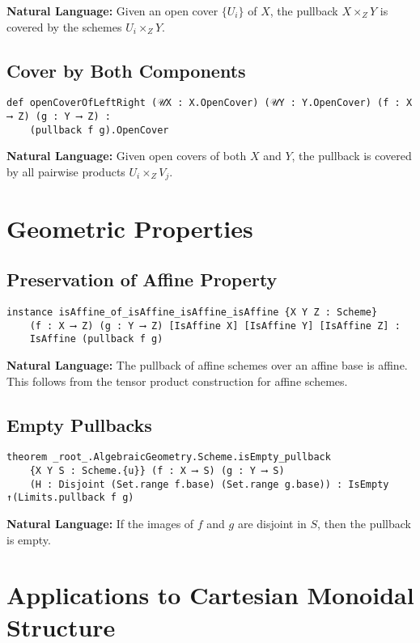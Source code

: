 \documentclass{article}
\theoremstyle{definition}
\begin{document}
\textbf{Natural Language:} Given an open cover $\{U_i\}$ of $X$, the pullback $X \times_Z Y$ is covered by the schemes $U_i \times_Z Y$.

\subsection{Cover by Both Components}

\begin{lstlisting}
def openCoverOfLeftRight (𝒰X : X.OpenCover) (𝒰Y : Y.OpenCover) (f : X ⟶ Z) (g : Y ⟶ Z) :
    (pullback f g).OpenCover
\end{lstlisting}

\textbf{Natural Language:} Given open covers of both $X$ and $Y$, the pullback is covered by all pairwise products $U_i \times_Z V_j$.

\section{Geometric Properties}

\subsection{Preservation of Affine Property}

\begin{lstlisting}
instance isAffine_of_isAffine_isAffine_isAffine {X Y Z : Scheme}
    (f : X ⟶ Z) (g : Y ⟶ Z) [IsAffine X] [IsAffine Y] [IsAffine Z] :
    IsAffine (pullback f g)
\end{lstlisting}

\textbf{Natural Language:} The pullback of affine schemes over an affine base is affine. This follows from the tensor product construction for affine schemes.

\subsection{Empty Pullbacks}

\begin{lstlisting}
theorem _root_.AlgebraicGeometry.Scheme.isEmpty_pullback
    {X Y S : Scheme.{u}} (f : X ⟶ S) (g : Y ⟶ S)
    (H : Disjoint (Set.range f.base) (Set.range g.base)) : IsEmpty ↑(Limits.pullback f g)
\end{lstlisting}

\textbf{Natural Language:} If the images of $f$ and $g$ are disjoint in $S$, then the pullback is empty.

\section{Applications to Cartesian Monoidal Structure}
\end{document}
